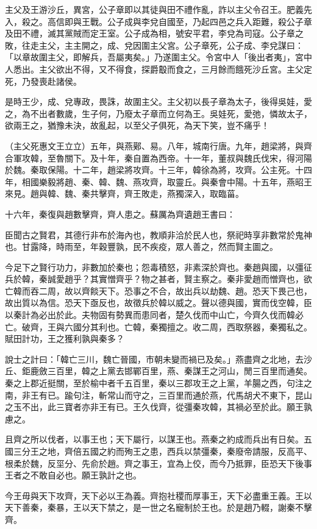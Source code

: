 \begin{pinyinscope}
主父及王游沙丘，異宮，公子章即以其徒與田不禮作亂，詐以主父令召王。肥義先入，殺之。高信即與王戰。公子成與李兌自國至，乃起四邑之兵入距難，殺公子章及田不禮，滅其黨賊而定王室。公子成為相，號安平君，李兌為司寇。公子章之敗，往走主父，主主開之，成、兌因圍主父宮。公子章死，公子成、李兌謀曰：「以章故圍主父，即解兵，吾屬夷矣。」乃遂圍主父。令宮中人「後出者夷」，宮中人悉出。主父欲出不得，又不得食，探爵鷇而食之，三月餘而餓死沙丘宮。主父定死，乃發喪赴諸侯。

是時王少，成、兌專政，畏誅，故圍主父。主父初以長子章為太子，後得吳娃，愛之，為不出者數歲，生子何，乃廢太子章而立何為王。吳娃死，愛弛，憐故太子，欲兩王之，猶豫未決，故亂起，以至父子俱死，為天下笑，豈不痛乎！

（主父死惠文王立立）五年，與燕鄚、易。八年，城南行唐。九年，趙梁將，與齊合軍攻韓，至魯關下。及十年，秦自置為西帝。十一年，董叔與魏氏伐宋，得河陽於魏。秦取保陽。十二年，趙梁將攻齊。十三年，韓徐為將，攻齊。公主死。十四年，相國樂毅將趙、秦、韓、魏、燕攻齊，取靈丘。與秦會中陽。十五年，燕昭王來見。趙與韓、魏、秦共擊齊，齊王敗走，燕獨深入，取臨菑。

十六年，秦復與趙數擊齊，齊人患之。蘇厲為齊遺趙王書曰：

臣聞古之賢君，其德行非布於海內也，教順非洽於民人也，祭祀時享非數常於鬼神也。甘露降，時雨至，年穀豐孰，民不疾疫，眾人善之，然而賢主圖之。

今足下之賢行功力，非數加於秦也；怨毒積怒，非素深於齊也。秦趙與國，以彊征兵於韓，秦誠愛趙乎？其實憎齊乎？物之甚者，賢主察之。秦非愛趙而憎齊也，欲亡韓而吞二周，故以齊餤天下。恐事之不合，故出兵以劫魏、趙。恐天下畏己也，故出質以為信。恐天下亟反也，故徵兵於韓以威之。聲以德與國，實而伐空韓，臣以秦計為必出於此。夫物固有勢異而患同者，楚久伐而中山亡，今齊久伐而韓必亡。破齊，王與六國分其利也。亡韓，秦獨擅之。收二周，西取祭器，秦獨私之。賦田計功，王之獲利孰與秦多？

說士之計曰：「韓亡三川，魏亡晉國，市朝未變而禍已及矣。」燕盡齊之北地，去沙丘、鉅鹿斂三百里，韓之上黨去邯鄲百里，燕、秦謀王之河山，閒三百里而通矣。秦之上郡近挺關，至於榆中者千五百里，秦以三郡攻王之上黨，羊腸之西，句注之南，非王有已。踰句注，斬常山而守之，三百里而通於燕，代馬胡犬不東下，昆山之玉不出，此三寶者亦非王有已。王久伐齊，從彊秦攻韓，其禍必至於此。願王孰慮之。

且齊之所以伐者，以事王也；天下屬行，以謀王也。燕秦之約成而兵出有日矣。五國三分王之地，齊倍五國之約而殉王之患，西兵以禁彊秦，秦廢帝請服，反高平、根柔於魏，反坙分、先俞於趙。齊之事王，宜為上佼，而今乃抵罪，臣恐天下後事王者之不敢自必也。願王孰計之也。

今王毋與天下攻齊，天下必以王為義。齊抱社稷而厚事王，天下必盡重王義。王以天下善秦，秦暴，王以天下禁之，是一世之名寵制於王也。於是趙乃輟，謝秦不擊齊。


\end{pinyinscope}
